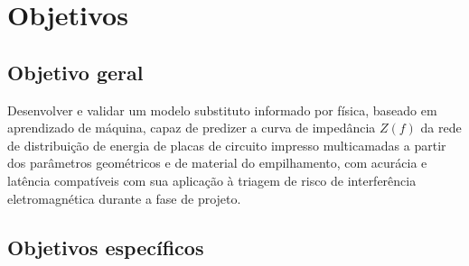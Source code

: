 \section{Objetivos}
\label{sec:objetivos}

\subsection{Objetivo geral}
\label{subsec:obj_geral}

Desenvolver e validar um modelo substituto informado por física, baseado em
aprendizado de máquina, capaz de predizer a curva de impedância $Z(f)$ da rede de
distribuição de energia de placas de circuito impresso multicamadas a partir dos
parâmetros geométricos e de material do empilhamento, com acurácia e latência
compatíveis com sua aplicação à triagem de risco de interferência eletromagnética
durante a fase de projeto.

\subsection{Objetivos específicos}
\label{subsec:obj_especificos}

